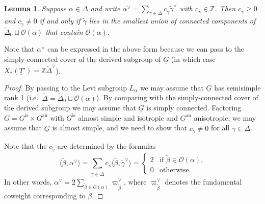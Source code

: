 \documentclass[a4paper]{amsart}
\numberwithin{equation}{section}
\newtheorem{lem}[thm]{Lemma}
\theoremstyle{remark}
\theoremstyle{definition}
\newcommand{\Z}{\mathbb{Z}}
\newcommand{\alggrp}[1]{\underline{#1}}
\newcommand{\an}{\mathrm{an}}
\newcommand{\is}{\mathrm{is}}
\newcommand{\ang}[1]{\langle #1\rangle}
\begin{document}
\begin{lem}\label{lm:rel-coroots}
  Suppose $\alpha \in \Delta$ and write $\alpha^{\vee} = \sum_{\widetilde{\gamma} \in \widetilde{\Delta}} c_{\widetilde{\gamma}} \widetilde{\gamma}^{\vee}$ with $c_{\widetilde{\gamma}} \in \Z$.
  Then $c_{\widetilde{\gamma}} \ge 0$ and $c_{\widetilde{\gamma}} \ne 0$ if and only if $\widetilde{\gamma}$ lies in the smallest union of connected components of $\widetilde{\Delta}_0 \sqcup \mathcal{O}(\alpha)$ that contain $\mathcal{O}(\alpha)$.
\end{lem}

Note that $\alpha^{\vee}$ can be expressed in the above form because we can pass to the simply-connected cover of the derived subgroup of $\alggrp{G}$ (in which case $X_*(\alggrp{T}') = \Z\widetilde{\Delta}^\vee$).

\begin{proof}
  By passing to the Levi subgroup $L_{\alpha}$ we may assume that $\alggrp{G}$ has semisimple rank 1 (i.e.\ $\widetilde{\Delta} = \widetilde{\Delta}_0 \sqcup \mathcal{O}(\alpha)$).
  By comparing with the simply-connected cover of the derived subgroup we may assume that $\alggrp{G}$ is simply connected.
  Factoring $\alggrp{G} = \alggrp{G}^\is \times \alggrp{G}^{\an}$ with $\alggrp{G}^\is$ almost simple and isotropic and $\alggrp{G}^{\an}$ anisotropic,
  we may assume that $\alggrp{G}$ is almost simple, and we need to show that $c_{\widetilde{\gamma}} \ne 0$ for all $\widetilde{\gamma} \in \widetilde{\Delta}$.

  Note that the $c_{\widetilde{\gamma}}$ are determined by the formulas
  \begin{equation*}
    \ang{\widetilde{\beta},\alpha^{\vee}} = \sum _{\widetilde{\gamma} \in \widetilde{\Delta}} c_{\widetilde{\gamma}} \ang{\widetilde{\beta},\widetilde{\gamma}^{\vee}}
    = 
    \begin{cases}
      2 & \text{if $\widetilde{\beta} \in \mathcal{O}(\alpha)$,} \\
      0 & \text{otherwise.}
    \end{cases}
  \end{equation*}
  In other words, $\alpha^{\vee} = 2\sum_{\widetilde{\beta} \in \mathcal{O}(\alpha)} \varpi^{\vee}_{\widetilde{\beta}}$, where $\varpi^{\vee}_{\widetilde{\beta}}$ denotes the fundamental coweight
  corresponding to $\widetilde{\beta}$.


\end{proof}
\end{document}

